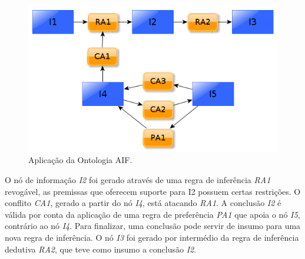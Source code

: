 \graphicspath{{figuras/}}
\begin{figure}[H]
\centering
\includegraphics[width=1\textwidth]{aplicacao_aif}
\caption{Aplicação da Ontologia AIF.} 
\label{aplicacao_aif}
\end{figure}

O nó de informação \textit{I2} foi gerado através de uma regra de inferência \textit{RA1} revogável, as premissas que oferecem suporte para I2 possuem certas restrições. O conflito \textit{CA1}, gerado a partir do nó \textit{I4}, está atacando \textit{RA1}. A conclusão \textit{I2} é válida por conta da aplicação de uma regra de preferência \textit{PA1} que apoia o nó \textit{I5}, contrário ao nó \textit{I4}. Para finalizar, uma conclusão pode servir de insumo para uma nova regra de inferência. O nó \textit{I3} foi gerado por intermédio da regra de inferência dedutiva \textit{RA2}, que teve como insumo a conclusão \textit{I2}.
  
